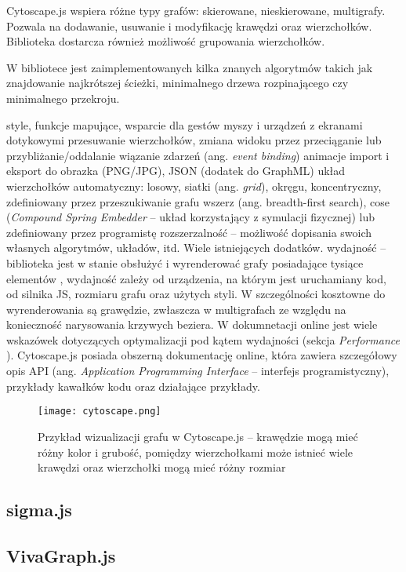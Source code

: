 Cytoscape.js wspiera różne typy grafów: skierowane, nieskierowane, multigrafy. Pozwala na dodawanie, usuwanie i modyfikację krawędzi oraz wierzchołków. Biblioteka dostarcza również możliwość grupowania wierzchołków.

W bibliotece jest zaimplementowanych kilka znanych algorytmów takich jak znajdowanie najkrótszej ścieżki, minimalnego drzewa rozpinającego czy minimalnego przekroju. 

style, funkcje mapujące, 
wsparcie dla gestów myszy i urządzeń z ekranami dotykowymi
przesuwanie wierzchołków, zmiana widoku przez przeciąganie lub przybliżanie/oddalanie
wiązanie zdarzeń (ang. \textit{event binding})  
animacje
import i eksport do obrazka (PNG/JPG), JSON (dodatek do GraphML)
układ wierzchołków automatyczny: losowy, siatki (ang. \textit{grid}), okręgu, koncentryczny, zdefiniowany przez przeszukiwanie grafu wszerz (ang. breadth-first search), cose (\textit{Compound Spring Embedder} -- układ korzystający z symulacji fizycznej) lub zdefiniowany przez programistę
rozszerzalność -- możliwość dopisania swoich własnych algorytmów, układów, itd. Wiele istniejących dodatków. 
wydajność -- biblioteka jest w stanie obsłużyć i wyrenderować grafy posiadające tysiące elementów \cite[310]{franz}, wydajność zależy od urządzenia, na którym jest uruchamiany kod, od silnika JS, rozmiaru grafu oraz użytych styli. W szczególności kosztowne do wyrenderowania są grawędzie, zwłaszcza w multigrafach ze względu na konieczność narysowania krzywych beziera. W dokumnetacji online jest wiele wskazówek dotyczących optymalizacji pod kątem wydajności (sekcja \textit{Performance} \cite{cytoscape}).
Cytoscape.js posiada obszerną dokumentację online, która zawiera szczegółowy opis API (ang. \textit{Application Programming Interface} -- interfejs programistyczny), przykłady kawałków kodu oraz działające przykłady. 


\begin{figure}[H]
\centering
\texttt{[image: cytoscape.png]}
\caption{Przykład wizualizacji grafu w Cytoscape.js -- krawędzie mogą mieć różny kolor i grubość, pomiędzy wierzchołkami może istnieć wiele krawędzi oraz wierzchołki mogą mieć różny rozmiar}\label{fig:cytoscape}
\end{figure}

\subsection{sigma.js}
\subsection{VivaGraph.js}
